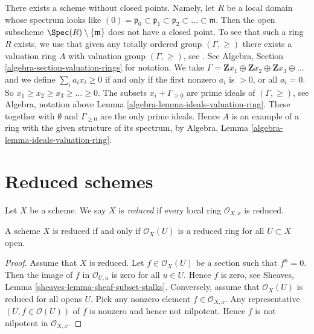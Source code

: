 \begin{example}
\label{example-scheme-without-closed-points}
There exists a scheme without closed points.
Namely, let $R$ be a local domain whose spectrum
looks like
$(0) = \mathfrak p_0 \subset \mathfrak p_1 \subset \mathfrak p_2
\subset \ldots \subset \mathfrak m$. Then the open subscheme
$\Spec(R) \setminus \{\mathfrak m\}$ does not have
a closed point. To see that such a ring $R$ exists, we use
that given any totally ordered group $(\Gamma, \geq)$
there exists a valuation ring $A$ with valuation group $(\Gamma, \geq)$,
see \cite{Krull}. See Algebra, Section \ref{algebra-section-valuation-rings}
for notation. We take
$\Gamma = \mathbf{Z}x_1 \oplus \mathbf{Z}x_2 \oplus \mathbf{Z}x_3 \oplus
\ldots$ and we define $\sum_i a_i x_i \geq 0$ if and only
if the first nonzero $a_i$ is $> 0$, or all $a_i = 0$.
So $x_1 \geq x_2 \geq x_3 \geq  \ldots \geq 0$.
The subsets $x_i + \Gamma_{\geq 0}$ are prime ideals
of $(\Gamma, \geq)$, see Algebra, notation above
Lemma \ref{algebra-lemma-ideals-valuation-ring}. These together
with $\emptyset$ and $\Gamma_{\geq 0}$ are the only prime ideals.
Hence $A$ is an example of a ring with the given structure of
its spectrum, by
Algebra, Lemma \ref{algebra-lemma-ideals-valuation-ring}.
\end{example}



















\section{Reduced schemes}
\label{section-reduced}

\begin{definition}
\label{definition-reduced}
Let $X$ be a scheme. We say $X$ is {\it reduced} if every local ring
$\mathcal{O}_{X, x}$ is reduced.
\end{definition}

\begin{lemma}
\label{lemma-reduced}
A scheme $X$ is reduced if and only if $\mathcal{O}_X(U)$
is a reduced ring for all $U \subset X$ open.
\end{lemma}

\begin{proof}
Assume that $X$ is reduced.
Let $f \in \mathcal{O}_X(U)$ be a section such that $f^n = 0$.
Then the image of $f$ in $\mathcal{O}_{U, u}$ is zero for
all $u \in U$. Hence $f$ is zero, see
Sheaves, Lemma \ref{sheaves-lemma-sheaf-subset-stalks}.
Conversely, assume that $\mathcal{O}_X(U)$ is reduced
for all opens $U$. Pick any nonzero element $f \in \mathcal{O}_{X, x}$.
Any representative $(U, f \in \mathcal{O}(U))$  of $f$ is nonzero and
hence not nilpotent. Hence $f$ is not nilpotent in $\mathcal{O}_{X, x}$.
\end{proof}

